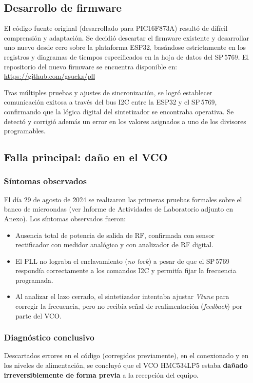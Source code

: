 \documentclass[12pt, a4paper]{article}
\begin{document}
	\subsection{Desarrollo de firmware}
	
	El código fuente original (desarrollado para PIC16F873A) resultó de difícil comprensión y adaptación.
	Se decidió descartar el firmware existente y desarrollar uno nuevo desde cero sobre la plataforma
	ESP32, basándose estrictamente en los registros y diagramas de tiempos especificados en la hoja de
	datos del SP\,5769. El repositorio del nuevo firmware se encuentra disponible en:
	\url{https://github.com/gsuckz/pll} 
	
	Tras múltiples pruebas y ajustes de sincronización, se logró establecer comunicación exitosa a través
	del bus I2C entre la ESP32 y el SP\,5769, confirmando que la lógica digital del sintetizador se
	encontraba operativa. Se detectó y corrigió además un error en los valores asignados a uno de los
	divisores programables.
	
	\subsection{Falla principal: daño en el VCO}
	
	\subsubsection{Síntomas observados}
	El día 29 de agosto de 2024 se realizaron las primeras pruebas formales sobre el banco de microondas
	(ver Informe de Actividades de Laboratorio adjunto en Anexo). Los síntomas observados fueron:
	
	\begin{itemize}[leftmargin=*]
		\item Ausencia total de potencia de salida de RF, confirmada con sensor rectificador con medidor
		analógico y con analizador de RF digital.
		\item El PLL no lograba el enclavamiento (\textit{no lock}) a pesar de que el SP\,5769 respondía
		correctamente a los comandos I2C y permitía fijar la frecuencia programada.
		\item Al analizar el lazo cerrado, el sintetizador intentaba ajustar \textit{Vtune} para corregir la
		frecuencia, pero no recibía señal de realimentación (\textit{feedback}) por parte del VCO.
	\end{itemize}
	
	\subsubsection{Diagnóstico conclusivo}
	Descartados errores en el código (corregidos previamente), en el conexionado y en los niveles de
	alimentación, se concluyó que el VCO HMC534LP5 estaba \textbf{dañado irreversiblemente de forma
		previa} a la recepción del equipo.
	
\end{document}

